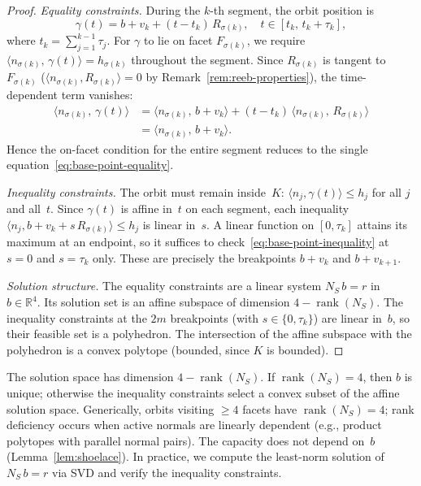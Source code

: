 \begin{proof}
\emph{Equality constraints.}
During the $k$-th segment, the orbit position is
\[
  \gamma(t) = b + v_k + (t - t_k)\, R_{\sigma(k)},
  \quad t \in [t_k,\, t_k + \tau_k],
\]
where $t_k = \sum_{j=1}^{k-1} \tau_j$.
For $\gamma$ to lie on facet $F_{\sigma(k)}$,
we require $\langle n_{\sigma(k)},\, \gamma(t) \rangle
= h_{\sigma(k)}$ throughout the segment.
Since $R_{\sigma(k)}$ is tangent to $F_{\sigma(k)}$
($\langle n_{\sigma(k)}, R_{\sigma(k)} \rangle = 0$
by Remark~\ref{rem:reeb-properties}),
the time-dependent term vanishes:
\begin{align*}
  \langle n_{\sigma(k)},\, \gamma(t) \rangle
  &= \langle n_{\sigma(k)},\, b + v_k \rangle
  + (t - t_k)\,
    \langle n_{\sigma(k)},\, R_{\sigma(k)} \rangle \\
  &= \langle n_{\sigma(k)},\, b + v_k \rangle.
\end{align*}
Hence the on-facet condition for the entire segment
reduces to the single
equation~\eqref{eq:base-point-equality}.

\emph{Inequality constraints.}
The orbit must remain inside~$K$:
$\langle n_j, \gamma(t) \rangle \leq h_j$
for all $j$ and all~$t$.
Since $\gamma(t)$ is affine in~$t$ on each segment,
each inequality $\langle n_j, b + v_k + s\, R_{\sigma(k)} \rangle
\leq h_j$ is linear in~$s$.
A linear function on $[0, \tau_k]$ attains its
maximum at an endpoint, so it suffices to
check~\eqref{eq:base-point-inequality}
at $s = 0$ and $s = \tau_k$ only.
These are precisely the breakpoints
$b + v_k$ and $b + v_{k+1}$.

\emph{Solution structure.}
The equality constraints are a linear system
$N_S\, b = r$ in~$b \in \mathbb{R}^4$.
Its solution set is an affine subspace of
dimension $4 - \operatorname{rank}(N_S)$.
The inequality constraints at the $2m$ breakpoints
(with $s \in \{0, \tau_k\}$) are linear in~$b$,
so their feasible set is a polyhedron.
The intersection of the affine subspace with
the polyhedron is a convex polytope (bounded,
since $K$ is bounded).
\end{proof}

\begin{remark}\label{rem:base-point-computation}
The solution space has dimension $4 - \operatorname{rank}(N_S)$.
If $\operatorname{rank}(N_S) = 4$, then $b$ is unique;
otherwise the inequality constraints select a
convex subset of the affine solution space.
Generically, orbits visiting $\geq 4$ facets have
$\operatorname{rank}(N_S) = 4$; rank deficiency occurs
when active normals are linearly dependent
(e.g., product polytopes with parallel normal pairs).
The capacity does not depend on~$b$
(Lemma~\ref{lem:shoelace}).
In practice, we compute the least-norm solution
of $N_S\, b = r$ via SVD and verify the
inequality constraints.\end{remark}


